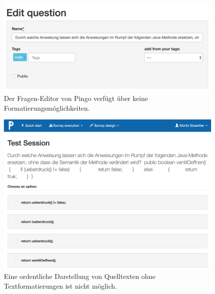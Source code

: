 \begin{figure}[H]
    \includegraphics[width=12cm]{chapter/bewertung/bilder/pingo_editor.png}
    \centering
    \caption[Fragen-Editor in Pingo ohne Formatierungsmöglichkeiten]{Der Fragen-Editor von Pingo verfügt über keine Formatierungsmöglichkeiten.}
    \label{abb:pingo_editor}
\end{figure}


\begin{figure}[H]
    \includegraphics[width=12cm]{chapter/bewertung/bilder/pingo_problem1.png}
    \centering
    \caption[Darstellung von Quelltexten in Pingo]{Eine ordentliche Darstellung von Quelltexten ohne Textformatierungen ist nicht möglich.}
    \label{abb:pingo_frage}
\end{figure}
